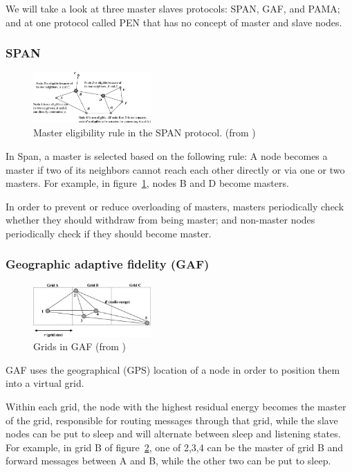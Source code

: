 \documentclass[conference]{IEEEtran}
\begin{document}
We will take a look at three master slaves protocols: SPAN, GAF, and PAMA;
and at one protocol called PEN that has no concept of master and slave nodes.

\subsubsection{SPAN}
\begin{figure}
\includegraphics[width=0.4\textwidth]{images/span-master-example}
\caption{Master eligibility rule in the SPAN protocol. (from \cite{alotaibi2012survey})}
\label{spanmaster}
\end{figure}
In Span\cite{chen2002span}, a master is selected based on the following rule:
A node becomes a master if two of its neighbors cannot reach each other directly
or via one or two masters. For example, in figure~\ref{spanmaster}, nodes B and
D become masters.

In order to prevent or reduce overloading of masters, masters periodically
check whether they should withdraw from being master; and non-master nodes
periodically check if they should become master.


\subsubsection{Geographic adaptive fidelity (GAF)}
\begin{figure}
\includegraphics[width=0.4\textwidth]{images/gaf-grids}
\caption{Grids in GAF (from \cite{alotaibi2012survey})}
\label{gafgrids}
\end{figure}
GAF\cite{xu2001geography} uses the geographical (GPS) location of a node in
order to position them into a virtual grid.

Within each grid, the node with the highest residual energy becomes the master
of the grid, responsible for routing messages through that grid, while the
slave nodes can be put to sleep and will alternate between sleep and listening
states. For example, in grid B of figure~\ref{gafgrids}, one of 2,3,4 can be the
master of grid B and forward messages between A and B, while the other two can
be put to sleep.
\end{document}
